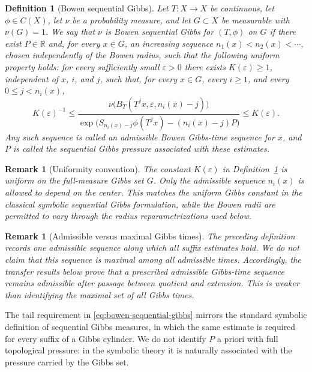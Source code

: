 \documentclass[11pt,a4paper]{article}
\newtheorem{remark}[theorem]{Remark}
\newtheorem{definition}[theorem]{Definition}
\newcommand{\eps}{\varepsilon}
\begin{document}
\begin{definition}[Bowen sequential Gibbs]
\label{def:bowen-sequential-gibbs}
Let $T:X\to X$ be continuous, let $\phi\in C(X)$, let $\nu$ be a probability
measure, and let $G\subset X$ be measurable with $\nu(G)=1$. We say that
$\nu$ is \emph{Bowen sequential Gibbs for $(T,\phi)$ on $G$} if there exist
$P\in\mathbb R$ and, for every $x\in G$, an increasing sequence
$n_1(x)<n_2(x)<\cdots$, chosen independently of the Bowen radius, such that
the following uniform property holds: for every sufficiently small
$\eps>0$ there exists $K(\eps)\ge1$, independent of $x$, $i$, and $j$,
such that, for every $x\in G$, every $i\ge1$, and every
$0\le j<n_i(x)$,
\begin{equation}
 K(\eps)^{-1}
 \le
 \frac{\nu\bigl(B_T(T^jx,\eps,n_i(x)-j)\bigr)}
 {\exp\bigl(S_{n_i(x)-j}\phi(T^jx)-(n_i(x)-j)P\bigr)}
 \le K(\eps).
 \label{eq:bowen-sequential-gibbs}
\end{equation}
Any such sequence is called an \emph{admissible Bowen Gibbs-time sequence}
for $x$, and $P$ is called the \emph{sequential Gibbs pressure} associated
with these estimates.
\end{definition}

\begin{remark}[Uniformity convention]
The constant $K(\eps)$ in Definition~\ref{def:bowen-sequential-gibbs} is
uniform on the full-measure Gibbs set $G$. Only the admissible sequence
$n_i(x)$ is allowed to depend on the center. This matches the uniform Gibbs
constant in the classical symbolic sequential Gibbs formulation, while the
Bowen radii are permitted to vary through the radius reparametrizations used
below.
\end{remark}

\begin{remark}[Admissible versus maximal Gibbs times]
The preceding definition records one admissible sequence along which all
suffix estimates hold. We do not claim that this sequence is maximal among
all admissible times. Accordingly, the transfer results below prove that a
prescribed admissible Gibbs-time sequence remains admissible after passage
between quotient and extension. This is weaker than identifying the maximal
set of all Gibbs times.
\end{remark}

The tail requirement in \eqref{eq:bowen-sequential-gibbs} mirrors the
standard symbolic definition of sequential Gibbs measures, in which the
same estimate is required for every suffix of a Gibbs cylinder. We do not
identify $P$ a priori with full topological pressure: in the symbolic theory
it is naturally associated with the pressure carried by the Gibbs set.
\end{document}
